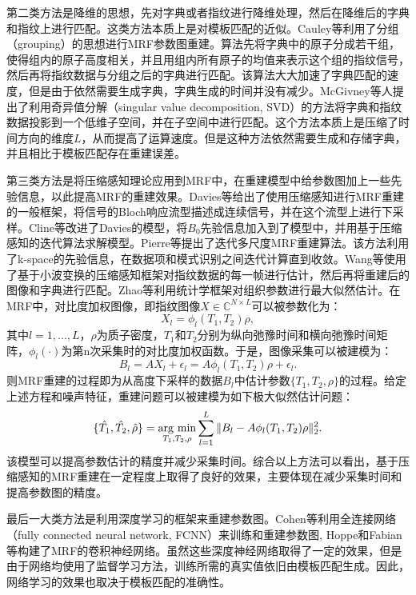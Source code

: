 第二类方法是降维的思想，先对字典或者指纹进行降维处理，然后在降维后的字典和指纹上进行匹配。这类方法本质上是对模板匹配的近似。Cauley\cite{groupingmrf}等利用了分组（grouping）的思想进行MRF参数图重建。算法先将字典中的原子分成若干组，使得组内的原子高度相关，并且用组内所有原子的均值来表示这个组的指纹信号，然后再将指纹数据与分组之后的字典进行匹配。该算法大大加速了字典匹配的速度，但是由于依然需要生成字典，字典生成的时间并没有减少。McGivney\cite{svdmrf}等人提出了利用奇异值分解（singular value decomposition, SVD）的方法将字典和指纹数据投影到一个低维子空间，并在子空间中进行匹配。这个方法本质上是压缩了时间方向的维度$L$，从而提高了运算速度。但是这种方法依然需要生成和存储字典，并且相比于模板匹配存在重建误差。

第三类方法是将压缩感知理论应用到MRF中，在重建模型中给参数图加上一些先验信息，以此提高MRF的重建效果。Davies\cite{davies2014compressed}等给出了使用压缩感知进行MRF重建的一般框架，将信号的Bloch响应流型描述成连续信号，并在这个流型上进行下采样。Cline\cite{cline2017air}等改进了Davies的模型，将$B_0$先验信息加入到了模型中，并用基于压缩感知的迭代算法求解模型。Pierre\cite{multiscale}等提出了迭代多尺度MRF重建算法。该方法利用了k-space的先验信息，在数据项和模式识别之间迭代计算直到收敛。Wang\cite{wang2016magnetic}等使用了基于小波变换的压缩感知框架对指纹数据的每一帧进行估计，然后再将重建后的图像和字典进行匹配。Zhao等\cite{zhao2016maximum}利用统计学框架对组织参数进行最大似然估计。在MRF中，对比度加权图像，即指纹图像$X\in \mathbb{C}^{N\times L}$可以被参数化为：
\begin{equation}
	X_l=\phi_l(T_1,T_2)\rho,
\end{equation}
其中$l=1,...,L$，$\rho$为质子密度，$T_1$和$T_2$分别为纵向弛豫时间和横向弛豫时间矩阵，$\phi_l(\cdot)$为第n次采集时的对比度加权函数。于是，图像采集可以被建模为：
\begin{equation}
	B_l=AX_l+\epsilon_l=A\phi_l(T_1,T_2)\rho+\epsilon_l.
\end{equation}
则MRF重建的过程即为从高度下采样的数据$B_l$中估计参数$\{T_1,T_2,\rho\}$的过程。给定上述方程和噪声特征，重建问题可以被建模为如下极大似然估计问题：
\begin{equation}
	\{\hat{T_1},\hat{T_2},\hat{\rho}\}=\argmin_{T_1,T_2,\rho}\sum_{l=1}^L\|B_l-A\phi_l(T_1,T_2)\rho\|_2^2.
\end{equation}
该模型可以提高参数估计的精度并减少采集时间。综合以上方法可以看出，基于压缩感知的MRF重建在一定程度上取得了良好的效果，主要体现在减少采集时间和提高参数图的精度。

最后一大类方法是利用深度学习的框架来重建参数图。Cohen\cite{cohen2018mr}等利用全连接网络（fully connected neural network, FCNN）来训练和重建参数图, Hoppe\cite{hoppe2017deep}和Fabian\cite{balsiger2018magnetic}等构建了MRF的卷积神经网络。虽然这些深度神经网络取得了一定的效果，但是由于网络均使用了监督学习方法，训练所需的真实值依旧由模板匹配生成。因此，网络学习的效果也取决于模板匹配的准确性。

